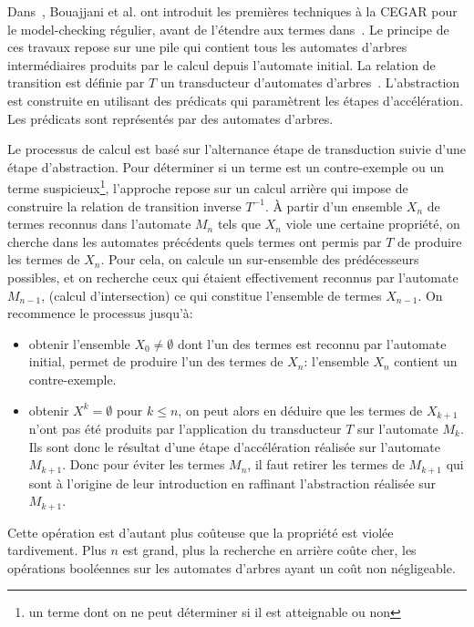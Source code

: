 Dans~\cite{DBLP:conf/cav/BouajjaniHV04}, Bouajjani et al. ont introduit les premières
techniques à la CEGAR pour le model-checking régulier, avant de
l'étendre aux termes dans~\cite{BouajjaniHRV-Infinity06,BouajjaniHRV-SAS06}. 
Le principe de ces travaux repose sur une pile qui contient tous les automates d'arbres
intermédiaires produits par le calcul depuis l'automate initial.
La relation de transition est définie par $T$ un transducteur d'automates
d'arbres~\cite{TATA}. L'abstraction est construite en utilisant des prédicats 
qui paramètrent les étapes d'accélération.
Les prédicats sont représentés par des automates d'arbres.

Le processus de calcul est basé sur l'alternance étape de transduction
suivie d'une étape d'abstraction. Pour déterminer si un terme
est un contre-exemple ou un terme suspicieux\footnote{\footnotesize un terme dont on ne peut
déterminer si il est atteignable ou non}, l'approche repose sur un
calcul arrière qui impose de construire la relation de transition
inverse $T^{-1}$. À partir d'un ensemble $X_n$ de termes reconnus dans l'automate $M_n$ tels que $X_n$
viole une certaine propriété, on cherche dans les automates précédents quels termes ont permis par $T$
de produire les termes de $X_n$. Pour cela, on calcule un sur-ensemble des prédécesseurs possibles, 
et on recherche ceux qui étaient effectivement reconnus par l'automate $M_{n-1}$, (calcul d'intersection)
ce qui constitue l'ensemble de termes $X_{n-1}$. On recommence le processus jusqu'à:
\begin{itemize}
\item obtenir l'ensemble $X_0 \not= \emptyset$ dont l'un des termes est reconnu par l'automate initial,
  permet de produire l'un des termes de $X_n$: l'ensemble  $X_n$ contient un contre-exemple.

\item obtenir $X^k = \emptyset$ pour $k \le n$, on peut alors en déduire 
  que les termes de $X_{k+1}$ n'ont pas été produits par l'application du transducteur $T$ sur l'automate $M_k$.
  Ils sont donc le résultat d'une étape d'accélération réalisée sur l'automate $M_{k+1}$.
  Donc pour éviter les termes $M_n$, il faut retirer les termes de $M_{k+1}$ qui sont
  à l'origine de leur introduction en raffinant l'abstraction réalisée sur $M_{k+1}$.
\end{itemize}
Cette opération est d'autant plus coûteuse que la propriété est violée tardivement. 
Plus $n$ est grand, plus la recherche en arrière coûte cher, les opérations booléennes sur
les automates d'arbres ayant un coût non négligeable.



